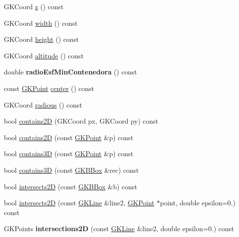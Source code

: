 \begin{DoxyCompactItemize}
\item 
G\+K\+Coord \hyperlink{classGKBBox_ae36232dda9ccdec81abaa8ebc009ccd7}{z} () const 
\item 
G\+K\+Coord \hyperlink{classGKBBox_a59a65c87c87647a8ba76042d5823ee4b}{width} () const 
\item 
G\+K\+Coord \hyperlink{classGKBBox_ae7584a835d849c6e48db731560b4c657}{height} () const 
\item 
G\+K\+Coord \hyperlink{classGKBBox_a7495da2c883c0ff50609b40e2b51b41e}{altitude} () const 
\item 
double {\bfseries radio\+Esf\+Min\+Contenedora} () const \hypertarget{classGKBBox_a2c5a51d45f5dc7344d7398d7534c3174}{}\label{classGKBBox_a2c5a51d45f5dc7344d7398d7534c3174}

\item 
const \hyperlink{classGKPoint}{G\+K\+Point} \hyperlink{classGKBBox_a14e3417d8315b7e9a54080881181fe42}{center} () const 
\item 
G\+K\+Coord \hyperlink{classGKBBox_aedd86e69eeb9afd6bb2a0975d1924622}{radious} () const 
\item 
bool \hyperlink{classGKBBox_a7e9d32193fa69683ee353a5c44f749d7}{contains2D} (G\+K\+Coord px, G\+K\+Coord py) const 
\item 
bool \hyperlink{classGKBBox_a0bc0829bc5c9fc734f4f2bf27e3cd516}{contains2D} (const \hyperlink{classGKPoint}{G\+K\+Point} \&p) const 
\item 
bool \hyperlink{classGKBBox_a23d1a10b4e653aa0408f05736ffebbbb}{contains3D} (const \hyperlink{classGKPoint}{G\+K\+Point} \&p) const 
\item 
bool \hyperlink{classGKBBox_a245b9d4ecee6761297b8cc652b9abf26}{contains3D} (const \hyperlink{classGKBBox}{G\+K\+B\+Box} \&rec) const 
\item 
bool \hyperlink{classGKBBox_a45141d6026fbb6d569515376fb83eb9b}{intersects2D} (const \hyperlink{classGKBBox}{G\+K\+B\+Box} \&b) const 
\item 
bool \hyperlink{classGKBBox_a64de2a820a7b7fa08be5ae67439eef27}{intersects2D} (const \hyperlink{classGKLine}{G\+K\+Line} \&line2, \hyperlink{classGKPoint}{G\+K\+Point} $\ast$point, double epsilon=0.) const 
\item 
G\+K\+Points {\bfseries intersections2D} (const \hyperlink{classGKLine}{G\+K\+Line} \&line2, double epsilon=0.) const \hypertarget{classGKBBox_a4da81e600d467da0d2a554f503bd8890}{}\label{classGKBBox_a4da81e600d467da0d2a554f503bd8890}


\end{DoxyCompactItemize}
